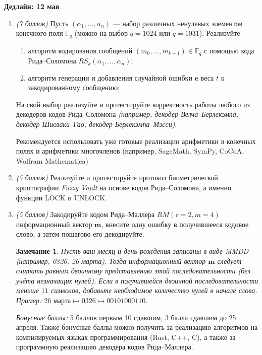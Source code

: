 \documentclass[12pt,letterpaper]{article}
\newcommand{\FF}{\mathds{F}}
\newtheorem*{remark}{Замечание}
\begin{document}
\textbf{Дедлайн: 12 мая}

\begin{enumerate}[\bfseries 1.]
  \item \emph{(7 баллов)} Пусть $(\alpha_1, \dots, \alpha_n)$ --- набор различных ненулевых элементов конечного поля $\FF_q$ (можно на выбор $q = 1024$ или $q=1031$). Реализуйте
  \begin{enumerate}[\it (a)]
    \item алгоритм кодирования сообщений $(m_0, \dots, m_{k-1}) \in \FF_q$ с помощью кода Рида--Соломона $RS_k(\alpha_1, \dots, \alpha_n)$;
    \item алгоритм генерации и добавления случайной ошибки $\mathbf{e}$ веса $t$ к закодированному сообщению;
  \end{enumerate}  
  На свой выбор реализуйте и протестируйте корректность работы любого из декодеров кодов Рида--Соломона \emph{(например, декодер Велча--Берлекэмпа, декодер Шиозаки--Гао, декодер Берлекэмпа--Мэсси)}.
  
  Рекомендуется использовать уже готовые реализации арифметики в конечных полях и арифметики многочленов (например, SageMath, SymPy, CoCoA, Wolfram Mathematica)

  \item \emph{(5 баллов)} Реализуйте и протестируйте протокол биометрической криптографии \emph{Fuzzy Vault} на основе кодов Рида--Соломона, а именно функции \textsf{LOCK} и \textsf{UNLOCK}.
  
  \item \emph{(5 баллов)} Закодируйте кодом Рида--Маллера $RM(r=2,m=4)$ информационный вектор $\mathbf{m}$, внесите одну ошибку в получившееся кодовое слово, а затем пошагово его декодируйте.
  \begin{remark}
    Пусть ваш месяц и день рождения записаны в виде \emph{MMDD} (например, 0326, 26 марта). Тогда
    информационный вектор $\mathbf{m}$ следует считать равным двоичному представлению этой
    последовательности (без учёта незначащих нулей). Если в получившейся двоичной последовательности меньше $11$ символов, добавьте необходимое количество нулей в начале слова. Пример: $\text{26 марта} \mapsto 0326 \mapsto 00101000110$.
  \end{remark}



  \emph{Бонусные баллы:} 5 баллов первым 10 сдавшим, 3 балла сдавшим до 25 апреля. Также бонусные баллы можно получить за реализацию алгоритмов на компилируемых языках программирования (Rust, C++, C), а также за программную реализацию декодера кодов Рида--Маллера.




\end{enumerate}
\end{document}
